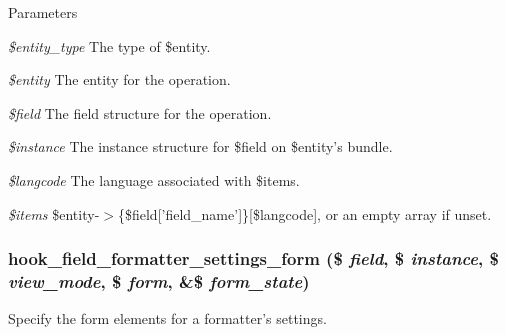 \begin{DoxyParams}{Parameters}
\item[{\em \$entity\_\-type}]The type of \$entity. \item[{\em \$entity}]The entity for the operation. \item[{\em \$field}]The field structure for the operation. \item[{\em \$instance}]The instance structure for \$field on \$entity's bundle. \item[{\em \$langcode}]The language associated with \$items. \item[{\em \$items}]\$entity-\/$>$\{\$field\mbox{[}'field\_\-name'\mbox{]}\}\mbox{[}\$langcode\mbox{]}, or an empty array if unset. \end{DoxyParams}
\hypertarget{group__field__types_gaf9b6aefe0b4fe6c03ebd5bd9bd1b891b}{
\subsubsection[{hook\_\-field\_\-formatter\_\-settings\_\-form}]{\setlength{\rightskip}{0pt plus 5cm}hook\_\-field\_\-formatter\_\-settings\_\-form (\$ {\em field}, \/  \$ {\em instance}, \/  \$ {\em view\_\-mode}, \/  \$ {\em form}, \/  \&\$ {\em form\_\-state})}}
\label{group__field__types_gaf9b6aefe0b4fe6c03ebd5bd9bd1b891b}
Specify the form elements for a formatter's settings.


